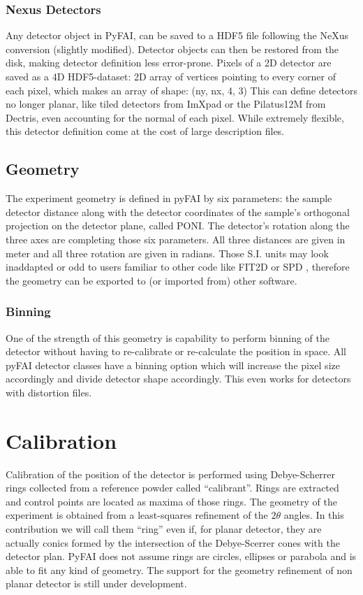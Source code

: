 \documentclass[preprint]{iucr}
\begin{document}
\subsubsection{Nexus Detectors}
Any detector object in PyFAI, can be saved to a HDF5 file following the NeXus
conversion (slightly modified).
Detector objects can then be restored from the disk, making detector definition
less error-prone.
Pixels of a 2D detector are saved as a 4D HDF5-dataset: 2D array of vertices
pointing to every corner of each pixel, which makes an array of shape: (ny, nx, 4, 3)
This can define detectors no longer planar, like tiled detectors from
ImXpad or the Pilatus12M from Dectris, even accounting for the normal of each
pixel. 
While extremely flexible, this detector definition come at the cost of
large description files.

\subsection{Geometry}
The experiment geometry is defined in pyFAI by six parameters: the sample
detector distance along with the detector coordinates of the sample's orthogonal
projection on the detector plane, called PONI. 
The detector's rotation along the three axes are completing those six
parameters. 
All three distances are given in meter and all three rotation are given
in radians.
Those S.I. units may look inaddapted or odd to users familiar to other code
like FIT2D \cite{fit2d} or SPD \cite{spd}, therefore the geometry can be
exported to (or imported from) other software.

 
\subsubsection{Binning}
One of the strength of this geometry is capability to perform binning of the
detector without having to re-calibrate or re-calculate the position in space.
All pyFAI detector classes have a binning option which will increase the pixel
size accordingly and divide detector shape accordingly. 
This even works for detectors with distortion files. 

\section{Calibration}
Calibration of the position of the detector is performed using Debye-Scherrer
rings collected from a reference powder called ``calibrant''.
Rings are extracted and control points are located as maxima of those rings.
The geometry of the experiment is obtained from a least-squares refinement of
the $2\theta$ angles.
In this contribution we will call them ``ring'' even if, for planar detector,
they are actually conics formed by the intersection of the Debye-Scerrer cones
with the detector plan. 
PyFAI does not assume rings are circles, ellipses or parabola and is able to fit
any kind of geometry. The support for the geometry refinement of non planar
detector is still under development.
\end{document}
